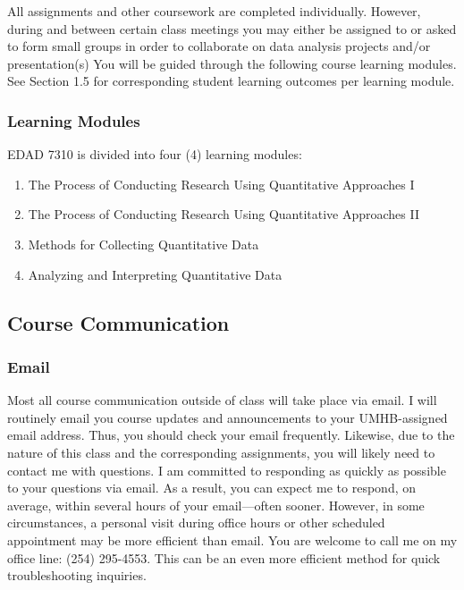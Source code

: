 \documentclass[
]{article}
\providecommand{\tightlist}{%
  \setlength{\itemsep}{0pt}\setlength{\parskip}{0pt}}
\begin{document}
All assignments and other coursework are completed individually.
However, during and between certain class meetings you may either be
assigned to or asked to form small groups in order to collaborate on
data analysis projects and/or presentation(s) You will be guided through
the following course learning modules. See Section 1.5 for corresponding
student learning outcomes per learning module.

\subsubsection{Learning Modules}

EDAD 7310 is divided into four (4) learning modules:

\begin{enumerate}
\def\labelenumi{\arabic{enumi}.}
\tightlist
\item
  The Process of Conducting Research Using Quantitative Approaches I
\item
  The Process of Conducting Research Using Quantitative Approaches II
\item
  Methods for Collecting Quantitative Data
\item
  Analyzing and Interpreting Quantitative Data
\end{enumerate}

\subsection{Course Communication}

\subsubsection{Email}

Most all course communication outside of class will take place via
email. I will routinely email you course updates and announcements to
your UMHB-assigned email address. Thus, you should check your email
frequently. Likewise, due to the nature of this class and the
corresponding assignments, you will likely need to contact me with
questions. I am committed to responding as quickly as possible to your
questions via email. As a result, you can expect me to respond, on
average, within several hours of your email---often sooner. However, in
some circumstances, a personal visit during office hours or other
scheduled appointment may be more efficient than email. You are welcome
to call me on my office line: (254) 295-4553. This can be an even more
efficient method for quick troubleshooting inquiries.
\end{document}
